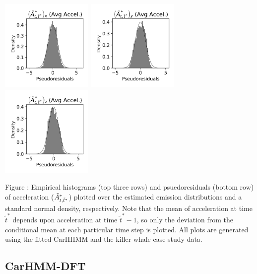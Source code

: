 \documentclass{article}
\begin{document}
\begin{center}
        \includegraphics[width=1.75in]{../Plots/2019/20190902-182840-CATs_OB_1_0_267_CarHHMM1_pseudresids_Ax.png}
        \includegraphics[width=1.75in]{../Plots/2019/20190902-182840-CATs_OB_1_0_267_CarHHMM1_pseudresids_Ay.png}
        \includegraphics[width=1.75in]{../Plots/2019/20190902-182840-CATs_OB_1_0_267_CarHHMM1_pseudresids_Az.png}
        \end{center}
        
        \noindent Figure : Empirical histograms (top three rows) and psuedoresiduals (bottom row) of acceleration ($\tilde{A}^*_{t,\tilde t^*}$) plotted over the estimated emission distributions and a standard normal density, respectively. Note that the mean of acceleration at time $\tilde t^*$ depends upon acceleration at time $\tilde t^*-1$, so only the deviation from the conditional mean at each particular time step is plotted. All plots are generated using the fitted CarHHMM and the killer whale case study data.
        \addtocounter{fignum}{1}
        
        \newpage
        
        \subsection{CarHMM-DFT}
        
\end{document}
